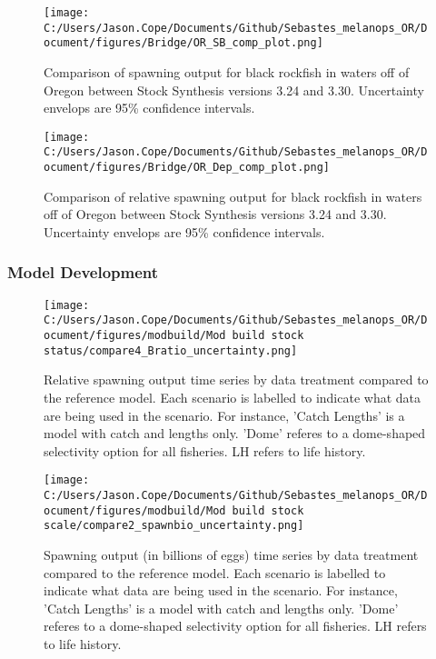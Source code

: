 \documentclass[11pt,
  letterpaper,
]{article}
\begin{document}
\newpage

\begin{figure}
{\centering
\texttt{[image: C:/Users/Jason.Cope/Documents/Github/Sebastes\_melanops\_OR/Document/figures/Bridge/OR\_SB\_comp\_plot.png]}
}
\caption{Comparison of spawning output for black rockfish in waters off of Oregon between Stock Synthesis versions 3.24 and 3.30. Uncertainty envelops are 95\% confidence intervals.\label{fig:ssb-bridge-comps}}
\end{figure}

\newpage

\begin{figure}
{\centering
\texttt{[image: C:/Users/Jason.Cope/Documents/Github/Sebastes\_melanops\_OR/Document/figures/Bridge/OR\_Dep\_comp\_plot.png]}
}
\caption{Comparison of relative spawning output for black rockfish in waters off of Oregon between Stock Synthesis versions 3.24 and 3.30. Uncertainty envelops are 95\% confidence intervals.\label{fig:deps-bridge-comps}}
\end{figure}

\clearpage

\hypertarget{model-development}{%
\subsubsection{Model Development}\label{model-development}}

\begin{figure}
{\centering
\texttt{[image: C:/Users/Jason.Cope/Documents/Github/Sebastes\_melanops\_OR/Document/figures/modbuild/Mod build stock status/compare4\_Bratio\_uncertainty.png]}
}
\caption{Relative spawning output time series by data treatment compared to the reference model. Each scenario is labelled to indicate what data are being used in the scenario. For instance, 'Catch Lengths' is a model with catch and lengths only. 'Dome' referes to a dome-shaped selectivity option for all fisheries. LH refers to life history.\label{fig:modbuild-data-depl}}
\end{figure}

\newpage

\begin{figure}
{\centering
\texttt{[image: C:/Users/Jason.Cope/Documents/Github/Sebastes\_melanops\_OR/Document/figures/modbuild/Mod build stock scale/compare2\_spawnbio\_uncertainty.png]}
}
\caption{Spawning output (in billions of eggs) time series by data treatment compared to the reference model. Each scenario is labelled to indicate what data are being used in the scenario. For instance, 'Catch Lengths' is a model with catch and lengths only. 'Dome' referes to a dome-shaped selectivity option for all fisheries. LH refers to life history.\label{fig:modbuild-data-ssb}}
\end{figure}
\end{document}

